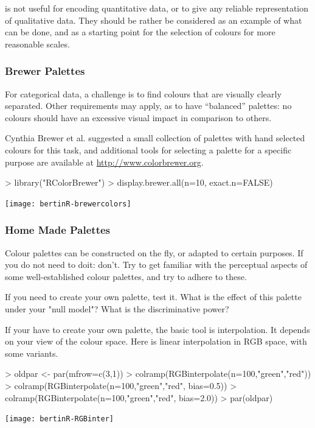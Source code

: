 \documentclass[nogin, dvips,12pt,a4paper,twoside]{amsart}
\begin{document}
 is not useful for encoding quantitative data, or to give any reliable representation of qualitative data. They should be rather be considered as an example of what can be done, and as a starting point for the selection of colours for more reasonable scales.

\clearpage
\subsubsection{Brewer Palettes}

For categorical data, a challenge is to find colours that are visually clearly separated. Other requirements may apply, as to have ``balanced'' palettes: no colours should have an excessive visual impact in comparison to others. 

Cynthia Brewer et al. suggested a small collection of palettes with hand selected colours for this task, and additional tools for selecting a palette for a specific purpose are available at \url{http://www.colorbrewer.org}.



\begin{center}
\begin{Schunk}
\begin{Sinput}
> library("RColorBrewer")
> display.brewer.all(n=10, exact.n=FALSE)
\end{Sinput}
\end{Schunk}
\texttt{[image: bertinR-brewercolors]}
\end{center}

\clearpage
\subsubsection{Home Made Palettes}
Colour palettes can be constructed on the fly, or adapted to certain purposes. 
If you do not need to doit: don't. 
Try to get familiar with the perceptual aspects of some well-established colour palettes, and try to adhere to these.

If you need to create your own palette, test it. What is  the effect of this palette under your "null model"? What is the discriminative power?

If your have to create your own palette, the basic tool is interpolation. It depends on your view of the colour space. Here is linear interpolation in RGB space, with some variants.

\begin{Schunk}
\begin{Sinput}
> oldpar <- par(mfrow=c(3,1)) 
> 	colramp(RGBinterpolate(n=100,"green","red"))
> 	colramp(RGBinterpolate(n=100,"green","red", bias=0.5))
> 	colramp(RGBinterpolate(n=100,"green","red", bias=2.0))
> par(oldpar)
\end{Sinput}
\end{Schunk}
\texttt{[image: bertinR-RGBinter]}
\end{document}
